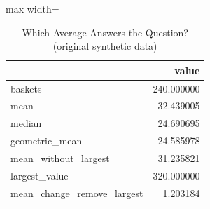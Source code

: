 \begin{table}[htbp]
\centering
\caption{Which Average Answers the Question? (original synthetic data)}
\begingroup
\small
\setlength{\tabcolsep}{6pt}
\renewcommand{\arraystretch}{1.12}
\begin{adjustbox}{max width=\linewidth}
\begin{tabular}{@{}lr@{}}
\toprule
 & value \\
\midrule
baskets & 240.000000 \\
mean & 32.439005 \\
median & 24.690695 \\
geometric\_mean & 24.585978 \\
mean\_without\_largest & 31.235821 \\
largest\_value & 320.000000 \\
mean\_change\_remove\_largest & 1.203184 \\
\bottomrule
\end{tabular}
\end{adjustbox}
\endgroup
\end{table}